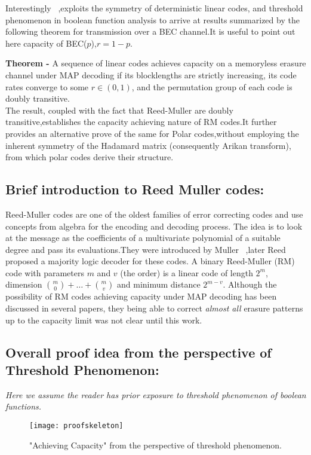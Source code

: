 \documentclass[
10pt, %
a4paper, %
oneside, %
headinclude,footinclude, %
BCOR5mm, %
]{scrartcl}
\begin{document}
Interestingly ~\cite{rm2},exploits the symmetry of deterministic linear codes, and threshold phenomenon in boolean function analysis to arrive at results summarized by the following theorem for transmission over a BEC channel.It is useful to point out here capacity of BEC($p$),$r=1-p$.

\textbf{Theorem - } A sequence of linear codes achieves capacity on
a memoryless erasure channel under MAP decoding if its blocklengths are strictly increasing, its code rates converge to some $r \in (0, 1)$, and the permutation group of each code is doubly transitive.\\
The result, coupled with the fact that Reed-Muller are doubly transitive,establishes the capacity achieving nature of RM codes.It further provides an alternative prove of the same for Polar codes,without employing the inherent symmetry of the Hadamard matrix (consequently Arikan transform), from which polar codes derive their structure.

\subsection*{Brief introduction to Reed Muller codes:}
Reed-Muller codes are one of the oldest families of error correcting codes and use
concepts from algebra for the encoding and decoding process. The idea is to look
at the message as the coefficients of a multivariate polynomial of a suitable degree and pass 
its evaluations.They were introduced by Muller~\cite{muller} ,later Reed~\cite{reed} proposed a majority logic decoder for these codes. A binary Reed-Muller (RM) code with parameters $m$ and $v$ (the order) is a linear code of length $2^m$, dimension ${m \choose 0}+\ldots+{m \choose v}$ and minimum distance $2^{m-v}$. Although the possibility of RM codes achieving capacity under MAP decoding has been discussed in several papers, they being able to correct \emph{almost all} erasure patterns up to the capacity limit was not clear until this work.

\subsection*{Overall proof idea from the perspective of Threshold Phenomenon:}
\emph{Here we assume the reader has prior exposure to threshold phenomenon of boolean functions.}
\begin{figure}[h]
\centering 
\texttt{[image: proofskeleton]} 
\caption[]{"Achieving Capacity" from the perspective of threshold phenomenon. } %
\label{fig:proofskel} 
\end{figure}
\end{document}
